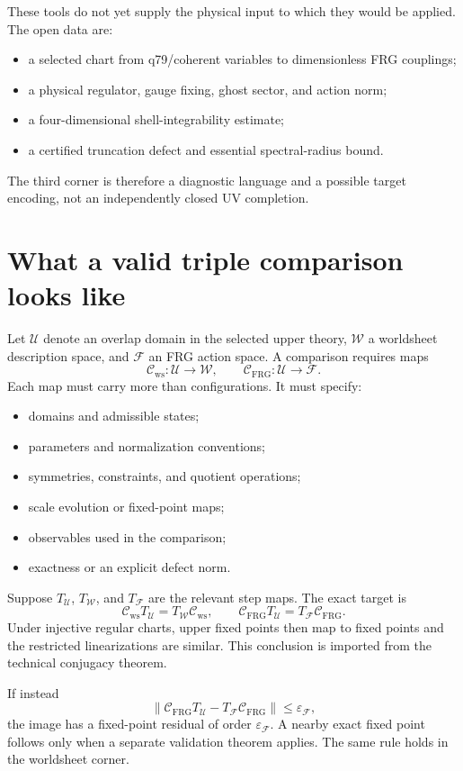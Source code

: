 \documentclass[11pt]{article}
\newcommand{\U}{\mathcal U}
\newcommand{\W}{\mathcal W}
\newcommand{\F}{\mathcal F}
\newcommand{\Cws}{\mathcal C_{\mathrm{ws}}}
\newcommand{\Cfrg}{\mathcal C_{\mathrm{FRG}}}
\begin{document}
These tools do not yet supply the physical input to which they would be
applied. The open data are:
\begin{itemize}
\item a selected chart from q79/coherent variables to dimensionless FRG
couplings;
\item a physical regulator, gauge fixing, ghost sector, and action norm;
\item a four-dimensional shell-integrability estimate;
\item a certified truncation defect and essential spectral-radius bound.
\end{itemize}

The third corner is therefore a diagnostic language and a possible target
encoding, not an independently closed UV completion.

\section{What a valid triple comparison looks like}

Let \(\U\) denote an overlap domain in the selected upper theory,
\(\W\) a worldsheet description space, and \(\F\) an FRG action space. A
comparison requires maps
\[
 \Cws:\U\to\W,
 \qquad
 \Cfrg:\U\to\F.
\]
Each map must carry more than configurations. It must specify:
\begin{itemize}
\item domains and admissible states;
\item parameters and normalization conventions;
\item symmetries, constraints, and quotient operations;
\item scale evolution or fixed-point maps;
\item observables used in the comparison;
\item exactness or an explicit defect norm.
\end{itemize}

Suppose \(T_{\U}\), \(T_{\W}\), and \(T_{\F}\) are the relevant step maps.
The exact target is
\[
 \Cws T_{\U}=T_{\W}\Cws,
 \qquad
 \Cfrg T_{\U}=T_{\F}\Cfrg.
\]
Under injective regular charts, upper fixed points then map to fixed points
and the restricted linearizations are similar. This conclusion is imported
from the technical conjugacy theorem.

If instead
\[
 \|\Cfrg T_{\U}-T_{\F}\Cfrg\|\leq\varepsilon_{\F},
\]
the image has a fixed-point residual of order
\(\varepsilon_{\F}\). A nearby exact fixed point follows only when a
separate validation theorem applies. The same rule holds in the worldsheet
corner.
\end{document}
